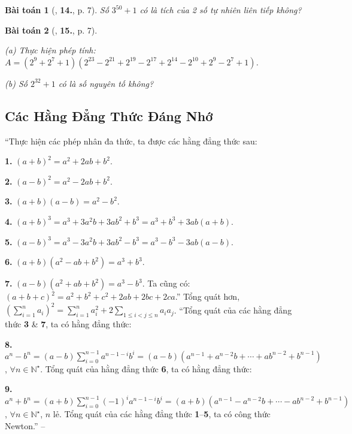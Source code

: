 \documentclass{article}
\numberwithin{equation}{section}
\newtheorem{baitoan}{Bài toán}[section]
\begin{document}
\begin{baitoan}[\cite{Binh_Toan_8_tap_1}, \textbf{14.}, p. 7]
	Số $3^{50} + 1$ có là tích của 2 số tự nhiên liên tiếp không?
\end{baitoan}

\begin{baitoan}[\cite{Binh_Toan_8_tap_1}, \textbf{15.}, p. 7]
	\begin{enumerate*}
		\item[(a)] Thực hiện phép tính: $A = (2^9 + 2^7 + 1)(2^{23} - 2^{21} + 2^{19} - 2^{17} + 2^{14} - 2^{10} + 2^9 - 2^7 + 1)$.
		\item[(b)] Số $2^{32} + 1$ có là số nguyên tố không?
	\end{enumerate*}
\end{baitoan}


\subsection{Các Hằng Đẳng Thức Đáng Nhớ}
``Thực hiện các phép nhân đa thức, ta được các hằng đẳng thức sau:
\begin{enumerate*}
	\item[\textbf{1.}] $(a + b)^2 = a^2 + 2ab + b^2$.
	\item[\textbf{2.}] $(a - b)^2 = a^2 - 2ab + b^2$.
	\item[\textbf{3.}] $(a + b)(a - b) = a^2 - b^2$.
	\item[\textbf{4.}] $(a + b)^3 = a^3 + 3a^2b + 3ab^2 + b^3 = a^3 + b^3 + 3ab(a + b)$.
	\item[\textbf{5.}] $(a - b)^3 = a^3 - 3a^2b + 3ab^2 - b^3 = a^3 - b^3 - 3ab(a - b)$.
	\item[\textbf{6.}] $(a + b)(a^2 - ab + b^2) = a^3 + b^3$.
	\item[\textbf{7.}] $(a - b)(a^2 + ab + b^2) = a^3 - b^3$. Ta cũng có: $(a + b + c)^2 = a^2 + b^2 + c^2 + 2ab + 2bc + 2ca$.'' Tổng quát hơn, $\left(\sum_{i=1}^n a_i\right)^2 = \sum_{i=1}^n a_i^2 + 2\sum_{1\le i < j\le n} a_ia_j$. ``Tổng quát của các hằng đẳng thức \textbf{3} \& \textbf{7}, ta có hằng đẳng thức:
	\item[\textbf{8.}] $a^n - b^n = (a - b)\sum_{i=0}^{n-1} a^{n-1-i}b^i = (a - b)\left(a^{n-1} + a^{n-2}b + \cdots + ab^{n-2} + b^{n-1}\right)$, $\forall n\in\mathbb{N}^\star$. Tổng quát của hằng đẳng thức \textbf{6}, ta có hằng đẳng thức:
	\item[\textbf{9.}] $a^n + b^n = (a + b)\sum_{i=0}^{n-1} (-1)^ia^{n-1-i}b^i = (a + b)\left(a^{n-1} - a^{n-2}b + \cdots - ab^{n-2} + b^{n-1}\right)$, $\forall n\in\mathbb{N}^\star$, $n$ lẻ. Tổng quát của các hằng đẳng thức \textbf{1}--\textbf{5}, ta có công thức Newton.'' -- \cite[pp. 7--8]{Binh_Toan_8_tap_1}
\end{enumerate*}
\end{document}
